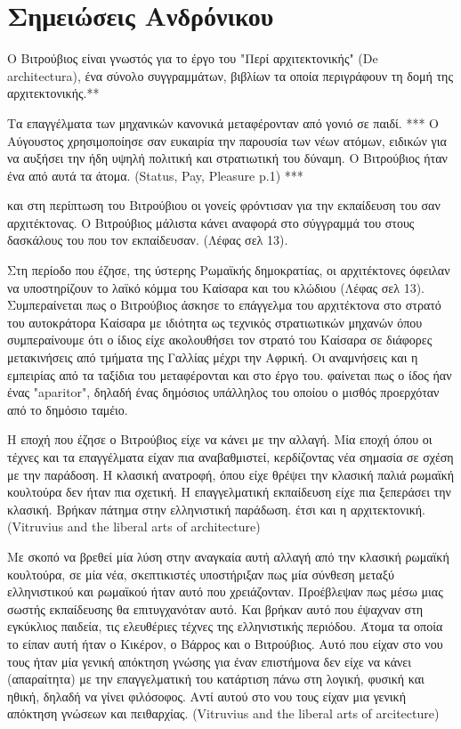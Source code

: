 
\section{Σημειώσεις Ανδρόνικου}

 Ο 
Βιτρούβιος είναι γνωστός για το έργο του "Περί αρχιτεκτονικής" (De 
architectura), ένα σύνολο συγγραμμάτων, βιβλίων τα οποία περιγράφουν τη δομή 
της αρχιτεκτονικής.**

Τα επαγγέλματα των μηχανικών κανονικά μεταφέρονταν από γονιό σε παιδί.  *** 
Ο Αύγουστος χρησιμοποίησε σαν ευκαιρία την παρουσία των νέων ατόμων, ειδικών 
για να αυξήσει την ήδη υψηλή πολιτική και στρατιωτική του δύναμη. Ο Βιτρούβιος 
ήταν ένα από αυτά τα άτομα. (Status, Pay, Pleasure p.1) ***

και στη περίπτωση του Βιτρούβιου οι γονείς φρόντισαν για την εκπαίδευση του σαν 
αρχιτέκτονας. Ο Βιτρούβιος μάλιστα κάνει αναφορά στο σύγγραμμά του στους 
δασκάλους του που τον εκπαίδευσαν. (Λέφας σελ 13).

Στη περίοδο που έζησε, της ύστερης Ρωμαϊκής δημοκρατίας, οι αρχιτέκτονες 
όφειλαν να υποστηρίζουν το λαϊκό κόμμα του Καίσαρα και του κλώδιου (Λέφας σελ 
13). Συμπεραίνεται πως ο Βιτρούβιος άσκησε το επάγγελμα του αρχιτέκτονα στο 
στρατό του αυτοκράτορα Καίσαρα με ιδιότητα ως τεχνικός στρατιωτικών μηχανών 
όπου συμπεραίνουμε ότι ο ίδιος είχε ακολουθήσει τον στρατό του Καίσαρα σε 
διάφορες μετακινήσεις από τμήματα της Γαλλίας μέχρι την Αφρική. Οι αναμνήσεις 
και η εμπειρίας από τα ταξίδια του μεταφέρονται και στο έργο του. φαίνεται πως 
ο ίδος ήαν ένας "aparitor", δηλαδή ένας δημόσιος υπάλληλος του οποίου ο μισθός 
προερχόταν από το δημόσιο ταμέιο.

Η εποχή που έζησε ο Βιτρούβιος είχε να κάνει με την αλλαγή. Μία εποχή όπου οι 
τέχνες και τα επαγγέλματα είχαν πια αναβαθμιστεί, κερδίζοντας νέα σημασία σε 
σχέση με την παράδοση. Η κλασική ανατροφή, όπου είχε θρέψει την κλασική παλιά 
ρωμαϊκή κουλτούρα δεν ήταν πια σχετική. Η επαγγελματική εκπαίδευση είχε πια 
ξεπεράσει την κλασική. Βρήκαν πάτημα στην ελληνιστική παράδωση. έτσι και η 
αρχιτεκτονική. (Vitruvius and the liberal arts of architecture)

Με σκοπό να βρεθεί μία λύση στην αναγκαία αυτή αλλαγή από την κλασική ρωμαϊκή 
κουλτούρα, σε μία νέα, σκεπτικιστές υποστήριξαν πως μία σύνθεση μεταξύ 
ελληνιστικού και ρωμαϊκού ήταν αυτό που χρειάζονταν. Προέβλεψαν πως μέσω μιας 
σωστής εκπαίδευσης θα επιτυγχανόταν αυτό. Και βρήκαν αυτό που έψαχναν στη 
εγκύκλιος παιδεία, τις ελευθέριες τέχνες της ελληνιστικής περιόδου. Άτομα τα 
οποία το είπαν αυτή ήταν ο Κικέρον, ο Βάρρος και ο Βιτρούβιος. Αυτό που είχαν 
στο νου τους ήταν μία γενική απόκτηση γνώσης για έναν επιστήμονα δεν είχε να 
κάνει (απαραίτητα) με την επαγγελματική του κατάρτιση πάνω στη λογική, φυσική 
και ηθική, δηλαδή να γίνει φιλόσοφος. Αντί αυτού στο νου τους είχαν μια γενική 
απόκτηση γνώσεων και πειθαρχίας. (Vitruvius and the liberal arts of 
arcitecture)

